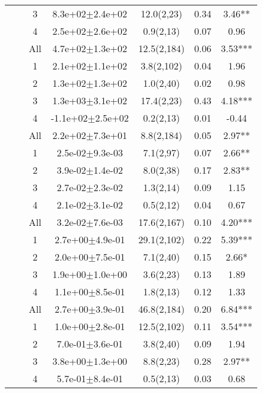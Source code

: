 \begin{longtable}{llccccS[table-format=-2.2, table-space-text-post = {***}]}
   &  & 3 &  8.3e+02$\pm$2.4e+02 & 12.0(2,23) & 0.34 & 3.46** \\ 
   &  & 4 &  2.5e+02$\pm$2.6e+02 & 0.9(2,13) & 0.07 & 0.96 \\ 
   &  & All &  4.7e+02$\pm$1.3e+02 & 12.5(2,184) & 0.06 & 3.53*** \\ 
   \midrule
{} & {} & 1 &  2.1e+02$\pm$1.1e+02 & 3.8(2,102) & 0.04 & 1.96 \\ 
   &  & 2 &  1.3e+02$\pm$1.3e+02 & 1.0(2,40) & 0.02 & 0.98 \\ 
   &  & 3 &  1.3e+03$\pm$3.1e+02 & 17.4(2,23) & 0.43 & 4.18*** \\ 
   &  & 4 & -1.1e+02$\pm$2.5e+02 & 0.2(2,13) & 0.01 & -0.44 \\ 
   &  & All &  2.2e+02$\pm$7.3e+01 & 8.8(2,184) & 0.05 & 2.97** \\ 
   \midrule
{} & {} & 1 &  2.5e-02$\pm$9.3e-03 & 7.1(2,97) & 0.07 & 2.66** \\ 
   &  & 2 &  3.9e-02$\pm$1.4e-02 & 8.0(2,38) & 0.17 & 2.83** \\ 
   &  & 3 &  2.7e-02$\pm$2.3e-02 & 1.3(2,14) & 0.09 & 1.15 \\ 
   &  & 4 &  2.1e-02$\pm$3.1e-02 & 0.5(2,12) & 0.04 & 0.67 \\ 
   &  & All &  3.2e-02$\pm$7.6e-03 & 17.6(2,167) & 0.10 & 4.20*** \\ 
   \midrule
{} & {} & 1 &  2.7e+00$\pm$4.9e-01 & 29.1(2,102) & 0.22 & 5.39*** \\ 
   &  & 2 &  2.0e+00$\pm$7.5e-01 & 7.1(2,40) & 0.15 & 2.66* \\ 
   &  & 3 &  1.9e+00$\pm$1.0e+00 & 3.6(2,23) & 0.13 & 1.89 \\ 
   &  & 4 &  1.1e+00$\pm$8.5e-01 & 1.8(2,13) & 0.12 & 1.33 \\ 
   &  & All &  2.7e+00$\pm$3.9e-01 & 46.8(2,184) & 0.20 & 6.84*** \\ 
   \midrule
{} & {} & 1 &  1.0e+00$\pm$2.8e-01 & 12.5(2,102) & 0.11 & 3.54*** \\ 
   &  & 2 &  7.0e-01$\pm$3.6e-01 & 3.8(2,40) & 0.09 & 1.94 \\ 
   &  & 3 &  3.8e+00$\pm$1.3e+00 & 8.8(2,23) & 0.28 & 2.97** \\ 
   &  & 4 &  5.7e-01$\pm$8.4e-01 & 0.5(2,13) & 0.03 & 0.68 \\ 

\end{longtable}
